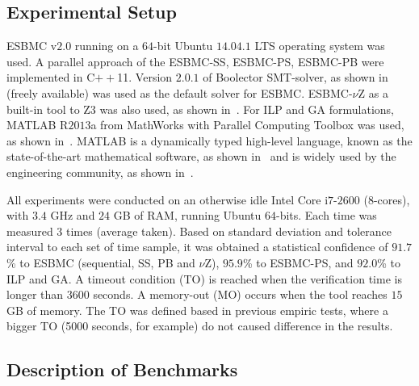 \documentclass{doublecol-new}
\theoremstyle{TH}{
\newtheorem{lemma}{Lemma}
\newtheorem{theorem}[lemma]{Theorem}
\newtheorem{corrolary}[lemma]{Corrolary}
\newtheorem{conjecture}[lemma]{Conjecture}
\newtheorem{proposition}[lemma]{Proposition}
\newtheorem{claim}[lemma]{Claim}
\newtheorem{stheorem}[lemma]{Wrong Theorem}
\newtheorem{algorithm}{Algorithm}
}
\theoremstyle{THrm}{
\newtheorem{definition}{Definition}[section]
\newtheorem{question}{Question}[section]
\newtheorem{remark}{Remark}
\newtheorem{scheme}{Scheme}
}
\theoremstyle{THhit}{
\newtheorem{case}{Case}[section]
}
\begin{document}
\subsection{Experimental Setup}
\label{Experimental-Setup}

ESBMC v$2$.$0$ running on a $64$-bit Ubuntu $14$.$04$.$1$ LTS operating system was used. A parallel approach of the ESBMC-SS, ESBMC-PS, ESBMC-PB were implemented in C$++$11. Version $2$.$0$.$1$ of Boolector SMT-solver, as shown in~\cite{Brummayer2009} (freely available) was used as the default solver for ESBMC. ESBMC-$\nu$Z as a built-in tool to Z3 was also used, as shown in~\cite{Bjorner2014}.  For ILP and GA formulations, MATLAB R$2013$a from MathWorks with Parallel Computing Toolbox was used, as shown in~\cite{TheMathWorks2013}. MATLAB is a dynamically typed high-level language, known as the state-of-the-art mathematical software, as shown in~\cite{Tranquillo2011} and is widely used by the engineering community, as shown in~\cite{Hong2010}.

All experiments were conducted on an otherwise idle Intel Core i$7$-$2600$ ($8$-cores), with $3$.$4$ GHz and $24$ GB of RAM, running Ubuntu $64$-bits. Each time was measured $3$ times (average taken). Based on standard deviation and tolerance interval to each set of time sample, it was obtained a statistical confidence of $91.7$\% to ESBMC (sequential, SS, PB and $\nu$Z), $95.9$\% to ESBMC-PS, and $92.0$\% to ILP and GA. A timeout condition (TO) is reached when the verification time is longer than $3600$ seconds. A memory-out (MO) occurs when the tool reaches $15$ GB of memory. The TO was defined based in previous empiric tests, where a bigger TO (5000 seconds, for example) do not caused difference in the results. 

\subsection{Description of Benchmarks}
\label{Benchmarks-Description}
\end{document}
